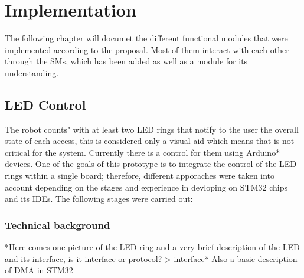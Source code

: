 \chapter{Implementation}\label{cha:implementation}

The following chapter will documet the different functional modules that were implemented according to the proposal. Most of them interact with each other through the SMs, which has been added as well as a module for its understanding.


\section{LED Control}\label{sec:leds}

The robot counts" with at least two LED rings that notify to the user the overall state of each access, this is considered only a visual aid which means that is not critical for the system. Currently there is a control for them using Arduino* devices. One of the goals of this prototype is to integrate the control of the LED rings within a single board; therefore, different apporaches were taken into account depending on the stages and experience in devloping on STM32 chips and its IDEs.
The following stages were carried out:
\subsection{Technical background}
*Here comes one picture of the LED ring and a very brief description of the LED and its interface, is it interface or protocol?-> interface*
Also a basic description of DMA in STM32

